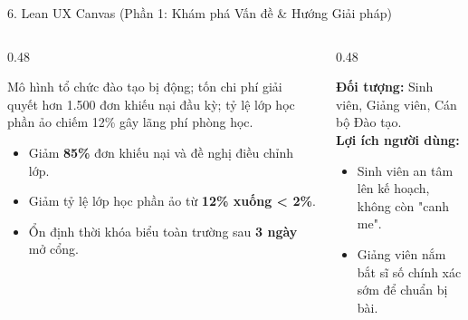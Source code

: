 \documentclass[aspectratio=169, 10pt]{beamer}
\begin{document}
\begin{frame}{6. Lean UX Canvas (Phần 1: Khám phá Vấn đề \& Hướng Giải pháp)}
    \begin{columns}[T]
        \begin{column}{0.48\textwidth}
            \begin{tcolorbox}[colback=CardBg, colframe=ThemeNavy, title=Box 1: Vấn đề Tổ chức (Business Problem)]
                \footnotesize
                Mô hình tổ chức đào tạo bị động; tốn chi phí giải quyết hơn 1.500 đơn khiếu nại đầu kỳ; tỷ lệ lớp học phần ảo chiếm 12\% gây lãng phí phòng học.
            \end{tcolorbox}
            
            \vspace{0.08cm}
            \begin{tcolorbox}[colback=CardBg, colframe=SoftTeal, title=Box 2: Kết quả Kỳ vọng (Business Outcomes)]
                \footnotesize
                \begin{itemize}
                    \item Giảm \textbf{85\%} đơn khiếu nại và đề nghị điều chỉnh lớp.
                    \item Giảm tỷ lệ lớp học phần ảo từ \textbf{12\% xuống < 2\%}.
                    \item Ổn định thời khóa biểu toàn trường sau \textbf{3 ngày} mở cổng.
                \end{itemize}
            \end{tcolorbox}
        \end{column}
        
        \begin{column}{0.48\textwidth}
            \begin{tcolorbox}[colback=CardBg, colframe=PrimaryBlue, title=Box 3 \& 4: Users \& User Outcomes]
                \footnotesize
                \textbf{Đối tượng:} Sinh viên, Giảng viên, Cán bộ Đào tạo.\\
                \textbf{Lợi ích người dùng:}
                \begin{itemize}
                    \item Sinh viên an tâm lên kế hoạch, không còn "canh me".
                    \item Giảng viên nắm bắt sĩ số chính xác sớm để chuẩn bị bài.
                \end{itemize}
            \end{tcolorbox}
            

\end{column}
\end{columns}
\end{frame}
\end{document}
